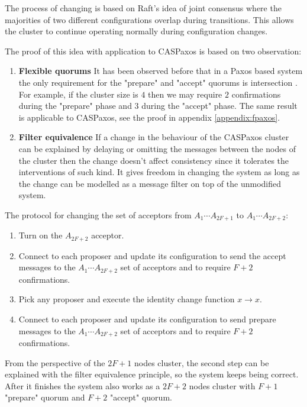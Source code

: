 \documentclass[12pt]{article}
\theoremstyle{definition}
\begin{document}
The process of changing is based on Raft's idea of joint consensus\cite{raft} where the majorities of two different configurations overlap during transitions. This allows the cluster to continue operating normally during configuration changes.

The proof of this idea with application to CASPaxos is based on two observation:

\begin{enumerate}
  \item {\bf Flexible quorums} It has been observed before that in a Paxos based system the only requirement for the "prepare" and "accept" quorums is intersection \cite{abcds}\cite{vertical}\cite{fpaxos}. For example, if the cluster size is $4$ then we may require $2$ confirmations during the "prepare" phase and $3$ during the "accept" phase. The same result is applicable to CASPaxos, see the proof in appendix \ref{appendix:fpaxos}.
  
  \item {\bf Filter equivalence} If a change in the behaviour of the CASPaxos cluster can be explained by delaying or omitting the messages between the nodes of the cluster then the change doesn't affect consistency since it tolerates the interventions of such kind. It gives freedom in changing the system as long as the change can be modelled as a message filter on top of the unmodified system.
\end{enumerate}

The protocol for changing the set of acceptors from $A_1 \cdots A_{2F+1}$ to $A_1 \cdots A_{2F+2}$:
\begin{enumerate}
  \item Turn on the $A_{2F+2}$ acceptor.
  \item Connect to each proposer and update its configuration to send the accept messages to the $A_1 \cdots A_{2F+2}$ set of acceptors and to require $F+2$ confirmations.
  \item Pick any proposer and execute the identity change function $x \to x$.
  \item Connect to each proposer and update its configuration to send prepare messages to the $A_1 \cdots A_{2F+2}$ set of acceptors and to require $F+2$ confirmations.
\end{enumerate}

From the perspective of the $2F+1$ nodes cluster, the second step can be explained with the filter equivalence principle, so the system keeps being correct. After it finishes the system also works as a $2F+2$ nodes cluster with $F+1$ "prepare" quorum and $F+2$ "accept" quorum.
\end{document}
